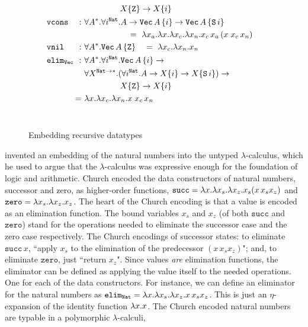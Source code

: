 \begin{figure}
\begin{singlespace}
\begin{align*}
&&& \qquad~\qquad X\{\texttt{Z}\} -> X\{i\} \\
 &\!\!\!\!\!\!\texttt{vcons} &\!\!\!\!\!\!\!\!:~& \forall A^{*}.\forall i^\mathtt{Nat}.A-> \mathtt{Vec}\,A\,\{i\}-> \mathtt{Vec}\,A\,\{\mathtt{S}\,i\} \\
&&&\;\qquad\qquad\quad =~ \l x_a.\l x.\l x_c.\l x_n. x_c\,x_a\,(x\;x_c\,x_n) \\
&\!\!\!\!\!\!\mathtt{vnil} &\!\!\!\!\!\!\!\!:~& \forall A^{*}.\texttt{Vec}\,A\,\{\mathtt{Z}\} 
~~~=~ \l x_c.\l x_n.x_n \\
&\!\!\!\!\!\!\mathtt{elim_{Vec}} &\!\!\!\!\!\!\!\!:~& \forall A^{*}.\forall i^\mathtt{Nat}.\texttt{Vec}\,A\,\{i\} -> \\
&&& \forall X^{\mathtt{Nat}-> *}.(\forall i^\mathtt{Nat}.A -> X\{i\} -> X\{\mathtt{S}\,i\}) -> \\
&&& \qquad~\qquad X\{\mathtt{Z}\} -> X\{i\} \\
& &\!\!\!\!\!=~& \l x.\l x_c. \l x_n.x\;x_c\,x_n
\end{align*} ~\vspace*{-14pt}
\end{singlespace}
\caption{Embedding recursive datatypes}
\label{fig:churchrec}
\end{figure}
\citet{Church33} invented an embedding of the natural numbers into
the untyped $\lambda$-calculus, which he used to argue
that the $\lambda$-calculus was expressive enough for the foundation of
logic and arithmetic. Church encoded the data constructors of natural numbers,
successor and zero, as higher-order functions,
$\mathtt{succ}=\lambda x.\lambda x_s.\lambda x_z.x_s(x\,x_s x_z)$ and
$\mathtt{zero}=\lambda x_s.\lambda x_z.x_z$.
The heart of the Church encoding is that a value is encoded as an elimination function.
The bound variables $x_s$ and $x_z$ (of both $\mathtt{succ}$ and $\mathtt{zero}$) stand for the operations needed to
eliminate the successor case and the zero case respectively. The Church encodings of
successor states: to eliminate $\mathtt{succ}\,x$, ``apply $x_s$
to the elimination of the predecessor $(x\,x_s x_z)$"; and,
to eliminate $\mathtt{zero}$, just ``return $x_z$".
Since values {\it are} elimination functions, the
eliminator can be defined as applying the value itself to the needed operations. One
for each of the data constructors. 
For instance, we can define an eliminator
for the natural numbers as $\mathtt{elim_{Nat}}=\lambda x.\lambda x_s.\lambda x_z.x\,x_s x_z$.
This is just an $\eta$-expansion of the identity function $\lambda x.x$.
The Church encoded natural numbers are typable in a polymorphic $\lambda$-calculi,
